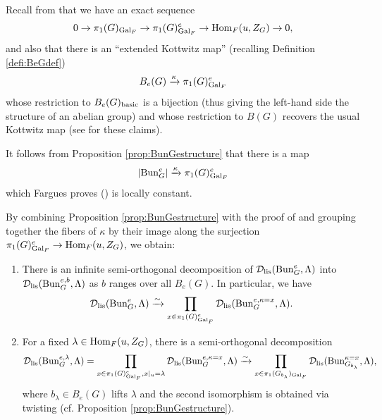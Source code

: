 Recall from \cite[\S 9.5]{Fargues22} that we have an exact sequence
\begin{equation}\label{eq:pi1eSES}
    0 \to \pi_{1}(G)_{\mathrm{Gal}_{F}} \to \pi_{1}(G)^{e}_{\mathrm{Gal}_{F}}  \to \mathrm{Hom}_{F}(u,Z_{G}) \to 0,
\end{equation}
and also that there is an ``extended Kottwitz map'' (recalling Definition \ref{defi:BeGdef})
\begin{equation*}
    B_{e}(G) \xrightarrow{\kappa}  \pi_{1}(G)^{e}_{\mathrm{Gal}_{F}}
\end{equation*}
whose restriction to $B_{e}(G)_{\textnormal{basic}}$ is a bijection (thus giving the left-hand side the structure of an abelian group) and whose restriction to $B(G)$ recovers the usual Kottwitz map (see \cite[\S 9.5.3]{Fargues22} for these claims).

It follows from Proposition \ref{prop:BunGestructure} that there is a map
\begin{equation*}
    |\mathrm{Bun}_{G}^{e}| \xrightarrow{\kappa} \pi_{1}(G)^{e}_{\mathrm{Gal}_{F}}
\end{equation*}
which Fargues proves (\cite[Proposition 12.5]{Fargues22}) is locally constant. 

By combining Proposition \ref{prop:BunGestructure} with the proof of \cite[Proposition VII.7.3]{Geometrization} and grouping together the fibers of $\kappa$ by their image along the surjection $\pi_{1}(G)^{e}_{\mathrm{Gal}_{F}}  \to \mathrm{Hom}_{F}(u,Z_{G})$, we obtain:
\begin{prop} \begin{enumerate}
   \item{There is an infinite semi-orthogonal decomposition of  $\mathcal{D}_{\textnormal{lis}}(\mathrm{Bun}_{G}^{e},\Lambda)$ into $\mathcal{D}_{\textnormal{lis}}(\mathrm{Bun}_{G}^{e,b},\Lambda)$ as $b$ ranges over all $B_{e}(G)$. In particular, we have  
    \begin{equation*}
        \mathcal{D}_{\textnormal{lis}}(\mathrm{Bun}_{G}^{e},\Lambda) \xrightarrow{\sim} \prod_{x \in \pi_{1}(G)^{e}_{\mathrm{Gal}_{F}}}  \mathcal{D}_{\textnormal{lis}}(\mathrm{Bun}_{G}^{e,\kappa = x},\Lambda).
    \end{equation*}}
    \item{For a fixed $\lambda \in  \mathrm{Hom}_{F}(u,Z_{G})$, there is a semi-orthogonal decomposition \begin{equation*}
\mathcal{D}_{\textnormal{lis}}(\mathrm{Bun}_{G}^{e,\lambda},\Lambda) =  \prod_{x \in \pi_{1}(G)^{e}_{\mathrm{Gal}_{F}}, x|_{u} = \lambda}  \mathcal{D}_{\textnormal{lis}}(\mathrm{Bun}_{G}^{e,\kappa = x},\Lambda) \xrightarrow{\sim} 
 \prod_{x \in \pi_{1}(G_{b_{\lambda}})_{\mathrm{Gal}_{F}}}  \mathcal{D}_{\textnormal{lis}}(\mathrm{Bun}_{G_{b_{\lambda}}}^{\kappa = x},\Lambda),
\end{equation*}
   where $b_{\lambda} \in B_{e}(G)$ lifts $\lambda$ and the second isomorphism is obtained via twisting (cf. Proposition \ref{prop:BunGestructure}).}
   \end{enumerate}
\end{prop}

